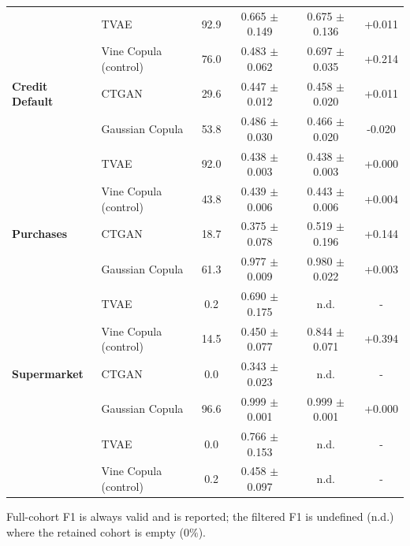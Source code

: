 \documentclass[pdflatex,sn-mathphys-num]{sn-jnl}
\theoremstyle{thmstyleone}%
\theoremstyle{thmstyletwo}%
\theoremstyle{thmstylethree}%
\begin{document}
\begin{table}[htbp]
\begin{tabular}{@{}llcccc@{}}
 & TVAE & 92.9 & 0.665 $\pm$ 0.149 & 0.675 $\pm$ 0.136 & +0.011 \\
 & Vine Copula (control) &76.0 & 0.483 $\pm$ 0.062 & 0.697 $\pm$ 0.035 & +0.214 \\
\midrule
\textbf{Credit Default} & CTGAN & 29.6 & 0.447 $\pm$ 0.012 & 0.458 $\pm$ 0.020 & +0.011 \\
  & Gaussian Copula & 53.8 & 0.486 $\pm$ 0.030 & 0.466 $\pm$ 0.020 & -0.020 \\
  & TVAE & 92.0 & 0.438 $\pm$ 0.003 & 0.438 $\pm$ 0.003 & +0.000 \\
  & Vine Copula (control) &43.8 & 0.439 $\pm$ 0.006 & 0.443 $\pm$ 0.006 & +0.004 \\
\midrule
 \textbf{Purchases} & CTGAN & 18.7 & 0.375 $\pm$ 0.078 & 0.519 $\pm$ 0.196 & +0.144 \\
  & Gaussian Copula & 61.3 & 0.977 $\pm$ 0.009 & 0.980 $\pm$ 0.022 & +0.003 \\
  & TVAE & 0.2 & 0.690 $\pm$ 0.175 & n.d. & - \\
    & Vine Copula (control) &14.5 & 0.450 $\pm$ 0.077 & 0.844 $\pm$ 0.071 & +0.394 \\
\midrule
\textbf{Supermarket} & CTGAN & 0.0 & 0.343 $\pm$ 0.023 & n.d. & - \\
 & Gaussian Copula & 96.6 & 0.999 $\pm$ 0.001 & 0.999 $\pm$ 0.001 & +0.000 \\
 & TVAE & 0.0 & 0.766 $\pm$ 0.153 & n.d. & - \\
 & Vine Copula (control) &0.2 & 0.458 $\pm$ 0.097 & n.d. & - \\
\bottomrule
\end{tabular}
\vspace{1ex}
\raggedright \scriptsize Full-cohort F1 is always valid and is reported; the filtered F1 is undefined (n.d.) where the retained cohort is empty ($0\%$).
\end{table}
\end{document}
